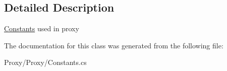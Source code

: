 \subsection{Detailed Description}
\hyperlink{class_proxy_1_1_constants}{Constants} used in proxy 



The documentation for this class was generated from the following file\+:\begin{DoxyCompactItemize}
\item 
Proxy/\+Proxy/Constants.\+cs\end{DoxyCompactItemize}
